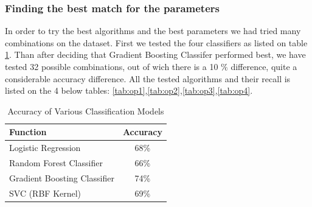\subsubsection{Finding the best match for the parameters}
In order to try the best algorithms and the best parameters we had tried many combinations on the dataset.
First we tested the four classifiers as listed on table \ref{tab:alg}. Than after deciding that Gradient Boosting Classifer performed best, we have tested 32 possible combinations, out of wich there is a 10 $\%$ difference, quite a considerable accuracy difference.
All the tested algorithms and their recall is listed on the 4 below tables: \ref{tab:op1},\ref{tab:op2},\ref{tab:op3},\ref{tab:op4}.

\begin{table}[H]
    \centering
    \begin{tabular}{|l|c|}
        \hline
        \textbf{Function} & \textbf{Accuracy} \\
        \hline
        Logistic Regression & 68\% \\
        Random Forest Classifier & 66\% \\
        Gradient Boosting Classifier & 74\% \\
        SVC (RBF Kernel) & 69\% \\
        \hline
    \end{tabular}
    \caption{Accuracy of Various Classification Models}
    \label{tab:alg}
\end{table}


